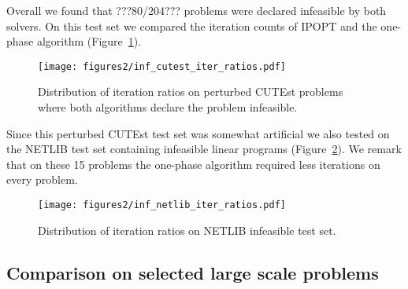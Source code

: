 \documentclass{article}
\begin{document}
Overall we found that ???80/204??? problems were declared infeasible by both solvers. On this test set we compared the iteration counts of IPOPT and the one-phase algorithm (Figure~\ref{fig:inf_cutest_iter_ratios}). 

\begin{figure}[H]
\texttt{[image: figures2/inf\_cutest\_iter\_ratios.pdf]}
\caption{Distribution of iteration ratios on perturbed CUTEst problems where both algorithms declare the problem infeasible.}\label{fig:inf_cutest_iter_ratios}
\end{figure}

Since this perturbed CUTEst test set was somewhat artificial we also tested on the NETLIB test set containing infeasible linear programs (Figure~\ref{fig:inf_netlib_iter_ratios}). We remark that on these 15 problems the one-phase algorithm required less iterations on every problem.

\begin{figure}[H]
\texttt{[image: figures2/inf\_netlib\_iter\_ratios.pdf]}
\caption{Distribution of iteration ratios on NETLIB infeasible test set.}\label{fig:inf_netlib_iter_ratios}
\end{figure}

\subsection{Comparison on selected large scale problems}\label{sec:large-scale}
\newcommand{\NETtimeOnePhase}{100}
\newcommand{\NETtimeIPOPT}{963}
\newcommand{\NETitOnePhase}{26}
\newcommand{\NETitIPOPT}{596}
\end{document}

